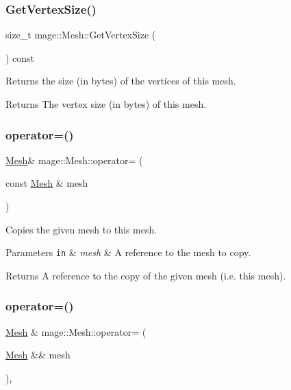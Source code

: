 \subsubsection{\texorpdfstring{Get\+Vertex\+Size()}{GetVertexSize()}}
{\footnotesize\ttfamily size\+\_\+t mage\+::\+Mesh\+::\+Get\+Vertex\+Size (\begin{DoxyParamCaption}{ }\end{DoxyParamCaption}) const\hspace{0.3cm}{\ttfamily [noexcept]}}

Returns the size (in bytes) of the vertices of this mesh.

\begin{DoxyReturn}{Returns}
The vertex size (in bytes) of this mesh. 
\end{DoxyReturn}
\hypertarget{classmage_1_1_mesh_a5baf961af32b379671a59a082492bc5e}{}\label{classmage_1_1_mesh_a5baf961af32b379671a59a082492bc5e} 
\subsubsection{\texorpdfstring{operator=()}{operator=()}\hspace{0.1cm}{\footnotesize\ttfamily [1/2]}}
{\footnotesize\ttfamily \hyperlink{classmage_1_1_mesh}{Mesh}\& mage\+::\+Mesh\+::operator= (\begin{DoxyParamCaption}\item[{const \hyperlink{classmage_1_1_mesh}{Mesh} \&}]{mesh }\end{DoxyParamCaption})\hspace{0.3cm}{\ttfamily [delete]}}

Copies the given mesh to this mesh.


\begin{DoxyParams}[1]{Parameters}
\mbox{\tt in}  & {\em mesh} & A reference to the mesh to copy. \\
\hline
\end{DoxyParams}
\begin{DoxyReturn}{Returns}
A reference to the copy of the given mesh (i.\+e. this mesh). 
\end{DoxyReturn}
\hypertarget{classmage_1_1_mesh_a58a0d5f808e097bec4017b10620a34f7}{}\label{classmage_1_1_mesh_a58a0d5f808e097bec4017b10620a34f7} 
\subsubsection{\texorpdfstring{operator=()}{operator=()}\hspace{0.1cm}{\footnotesize\ttfamily [2/2]}}
{\footnotesize\ttfamily \hyperlink{classmage_1_1_mesh}{Mesh} \& mage\+::\+Mesh\+::operator= (\begin{DoxyParamCaption}\item[{\hyperlink{classmage_1_1_mesh}{Mesh} \&\&}]{mesh }\end{DoxyParamCaption})\hspace{0.3cm}{\ttfamily [default]}, {\ttfamily [noexcept]}}

